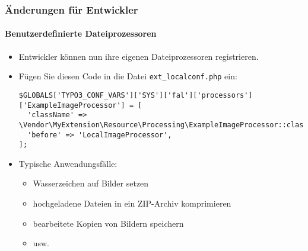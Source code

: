 \begin{frame}[fragile]
	\frametitle{Änderungen für Entwickler}
	\framesubtitle{Benutzerdefinierte Dateiprozessoren}

	\lstset{basicstyle=\tiny\ttfamily}

	\begin{itemize}
		\item Entwickler können nun ihre eigenen Dateiprozessoren registrieren.
		\item Fügen Sie diesen Code in die Datei \texttt{ext\_localconf.php} ein:

\begin{lstlisting}
$GLOBALS['TYPO3_CONF_VARS']['SYS']['fal']['processors']['ExampleImageProcessor'] = [
  'className' => \Vendor\MyExtension\Resource\Processing\ExampleImageProcessor::class,
  'before' => 'LocalImageProcessor',
];
\end{lstlisting}

		\item Typische Anwendungsfälle:

			\begin{itemize}
				\item Wasserzeichen auf Bilder setzen
				\item hochgeladene Dateien in ein ZIP-Archiv komprimieren
				\item bearbeitete Kopien von Bildern speichern
				\item usw.
			\end{itemize}

	\end{itemize}

\end{frame}


